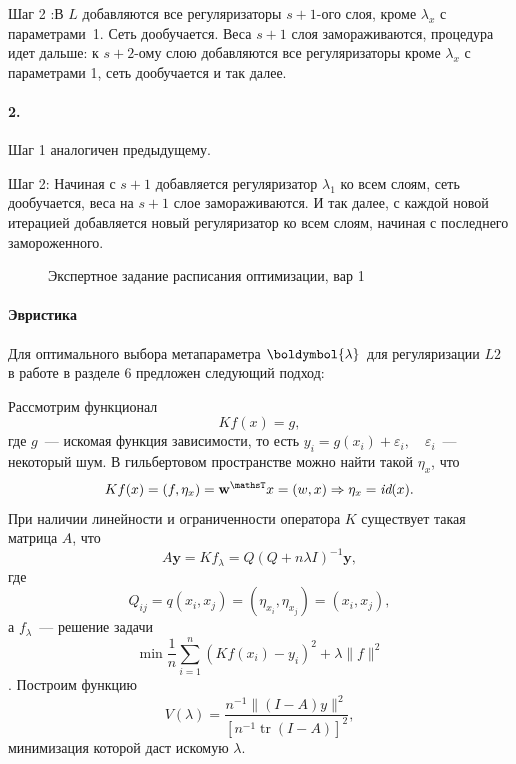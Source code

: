 \documentclass[12pt, twoside]{article}
\newcommand{\wm}{{\mathbf{w}}}
\begin{document}
Шаг 2 :В $L$ добавляются все регуляризаторы $s+1$-ого слоя, кроме $\lambda_x$ с параметрами~1. Сеть дообучается. Веса $s+1$ слоя замораживаются, процедура идет дальше: к $s+2$-ому слою добавляются все регуляризаторы кроме $\lambda_x$ с параметрами 1, сеть дообучается и так далее.

\paragraph{2.}

Шаг 1 аналогичен предыдущему.
 
Шаг 2: Начиная с $s+1$ добавляется регуляризатор $\lambda_1$ ко всем слоям, сеть дообучается, веса на $s+1$ слое замораживаются. И так далее, с каждой новой итерацией добавляется новый регуляризатор ко всем слоям, начиная с последнего замороженного.
\begin{figure}[h!]
\caption{Экспертное задание расписания оптимизации, вар 1}
\label{fig:opt schedule 1}
\end{figure}
\paragraph{Эвристика} Для оптимального выбора метапараметра $\boldymbol{\lambda}$ для регуляризации $L2$ в работе \cite{lukas1992methods} в разделе 6 предложен следующий подход:

Рассмотрим функционал 
\[K f(x)=g,\]
где $g$~--- искомая функция зависимости, то есть $y_i = g(x_i) + \varepsilon_i, \quad \varepsilon_i$~--- некоторый шум.
В гильбертовом пространстве можно найти такой $\eta_x$, что
\[K f(x)=\left(f, \eta_{x}\right) = \wm^\mathsT x = (w,x) \Rightarrow \eta_x = \textit{id}(x).\]
При наличии линейности и ограниченности оператора $K$ существует такая матрица $A$, что 
 \[A \boldsymbol{y}=K f_{ \lambda}=Q \left(Q+n \lambda I\right)^{-1} \boldsymbol{y},\]
 где
 \[Q_{ij} = q(x_i, x_j)=\left(\eta_{x_i}, \eta_{x_j}\right) = (x_i, x_j),\]
а $f_{\lambda}$~--- решение задачи
\[\min \frac{1}{n} \sum\limits_{i=1}^{n}(Kf(x_i) - y_i)^2 + \lambda \|f\|^2\].
 Построим функцию 
 \[V(\lambda)=\frac{n^{-1}\|(I-A) y\|^{2}}{\left[n^{-1} \operatorname{tr}(I-A)\right]^{2}},\]
 минимизация которой даст искомую $\lambda$.
\end{document}
